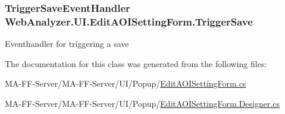 \subsubsection[{Trigger\+Save}]{\setlength{\rightskip}{0pt plus 5cm}Trigger\+Save\+Event\+Handler Web\+Analyzer.\+U\+I.\+Edit\+A\+O\+I\+Setting\+Form.\+Trigger\+Save}\label{class_web_analyzer_1_1_u_i_1_1_edit_a_o_i_setting_form_a5333229783b91948ba94f0ed0a947c6d}


Eventhandler for triggering a save 



The documentation for this class was generated from the following files\+:\begin{DoxyCompactItemize}
\item 
M\+A-\/\+F\+F-\/\+Server/\+M\+A-\/\+F\+F-\/\+Server/\+U\+I/\+Popup/\hyperlink{_edit_a_o_i_setting_form_8cs}{Edit\+A\+O\+I\+Setting\+Form.\+cs}\item 
M\+A-\/\+F\+F-\/\+Server/\+M\+A-\/\+F\+F-\/\+Server/\+U\+I/\+Popup/\hyperlink{_edit_a_o_i_setting_form_8_designer_8cs}{Edit\+A\+O\+I\+Setting\+Form.\+Designer.\+cs}\end{DoxyCompactItemize}
